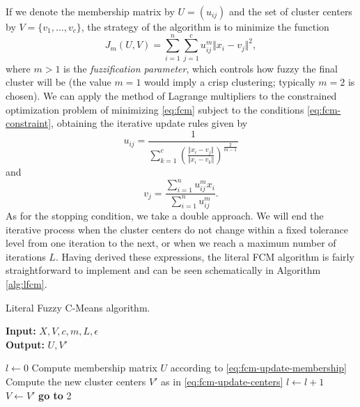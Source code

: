If we denote the membership matrix by $U=(u_{ij})$ and the set of cluster centers by $V=\{v_1,\dots, v_c\}$, the strategy of the algorithm is to minimize the function
\begin{equation} \label{eq:fcm}
J_m(U,V) = \sum_{i=1}^n \sum_{j=1}^c u_{ij}^m \Vert x_i - v_j \Vert ^2,
\end{equation}
where $m > 1$ is the \textit{fuzzification parameter}, which controls how fuzzy the final cluster will be (the value $m=1$ would imply a crisp clustering; typically $m=2$ is chosen). We can apply the method of Lagrange multipliers to the constrained optimization problem of minimizing \eqref{eq:fcm} subject to the conditions \eqref{eq:fcm-constraint}, obtaining the iterative update rules given by
\begin{equation} \label{eq:fcm-update-membership}
  u_{ij}= \dfrac{1}{\displaystyle \sum_{k=1}^c \left( \frac{\Vert x_i - v_j \Vert}{\Vert x_i - v_k \Vert} \right)^{\frac{2}{m-1}}}
\end{equation}
and
\begin{equation} \label{eq:fcm-update-centers}
v_j = \dfrac{\displaystyle\sum_{i=1}^n u_{ij}^m x_i}{\displaystyle\sum_{i=1}^n u_{ij}^m}.
\end{equation}
As for the stopping condition, we take a double approach. We will end the iterative process when the cluster centers do not change within a fixed tolerance level from one iteration to the next, or when we reach a maximum number of iterations $L$. Having derived these expressions, the literal FCM algorithm is fairly straightforward to implement and can be seen schematically in Algorithm \ref{alg:lfcm}.

\begin{algorithm}
  \caption{Literal Fuzzy C-Means algorithm.}
    \label{alg:lfcm}
    \textbf{Input:} $X,V,c,m,L, \epsilon$\\
    \textbf{Output:} $U,V'$
  \begin{algorithmic}[1]
    \State $l \gets 0$
    \State Compute membership matrix $U$ according to \eqref{eq:fcm-update-membership}
    \State Compute the new cluster centers $V'$ as in \eqref{eq:fcm-update-centers}
    \State $l \gets l+1$
     
      \State {}
    \Else
      \State $V \gets V'$
      \State \textbf{go to} 2
    \EndIf
  \end{algorithmic}
\end{algorithm}

